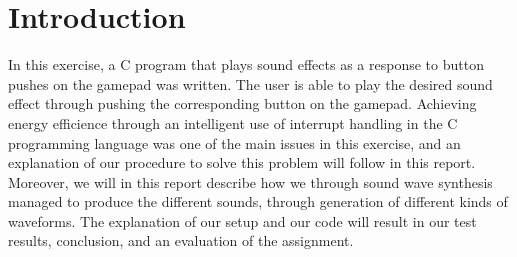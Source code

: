 \section{Introduction}

In this exercise, a C program that plays sound effects as a response to button pushes on the gamepad was written. 
The user is able to play the desired sound effect through pushing the corresponding button on the gamepad.
Achieving energy efficience through an intelligent use of interrupt handling in the C programming language was one of the main issues in this exercise, and an explanation of our procedure to solve this problem will follow in this report.
Moreover, we will in this report describe how we through sound wave synthesis managed to produce the different sounds, through generation of different kinds of waveforms.
The explanation of our setup and our code will result in our test results, conclusion, and an evaluation of the assignment.
